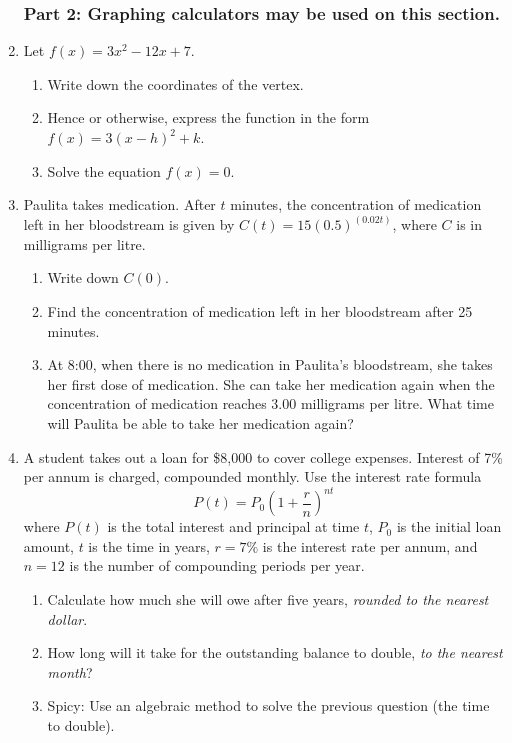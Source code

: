 \documentclass[12pt, twoside]{article}
\begin{document}
\begin{enumerate}
\newpage
\subsubsection*{Part 2: Graphing calculators may be used on this section.}

\item Let $f(x)=3x^2-12x+7$.
\begin{enumerate}
    \item Write down the coordinates of the vertex.
    \item Hence or otherwise, express the function in the form $f(x)=3(x-h)^2 +k$.
    \item Solve the equation  $f(x)=0$.
\end{enumerate}

\item Paulita takes medication. After $t$ minutes, the concentration of medication left in her bloodstream is given by $\displaystyle C(t)=15(0.5)^{(0.02t)}$, where $C$ is in milligrams per litre.
\begin{enumerate}
    \item Write down $C(0)$.
    \item Find the concentration of medication left in her bloodstream after 25 minutes.
    \item At 8:00, when there is no medication in Paulita's bloodstream, she takes her first dose of medication. She can take her medication again when the concentration of medication reaches 3.00 milligrams per litre. What time will Paulita be able to take her medication again?
\end{enumerate}

\item A student takes out a loan for \$8,000 to cover college expenses. Interest of 7\% per annum is charged, compounded monthly. Use the interest rate formula \[P(t)=P_0(1+\frac{r}{n})^{nt}\] where $P(t)$ is the total interest and principal at time $t$, $P_0$ is the initial loan amount, $t$ is the time in years, $r=7\%$ is the interest rate per annum, and $n=12$ is the number of compounding periods per year.
\begin{enumerate}
  \item Calculate how much she will owe after five years, \emph{rounded to the nearest dollar}.
  \item How long will it take for the outstanding balance to double, \emph{to the nearest month}?
  \item Spicy: Use an algebraic method to solve the previous question (the time to double).
\end{enumerate}


\end{enumerate}
\end{document}

